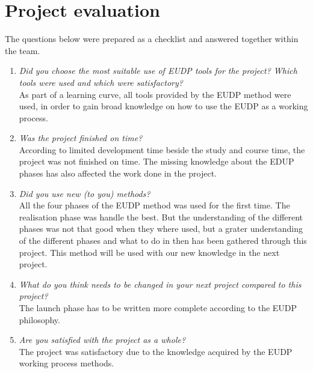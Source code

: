 \section{Project evaluation}
The questions below were prepared as a checklist and answered together within the team.
\begin{enumerate}
\item \textit{Did you choose the most suitable use of EUDP tools for the project? Which tools were used and which were satisfactory?}\\
		As part of a learning curve, all tools provided by the EUDP method were used, in order to gain broad knowledge on how to use the EUDP as a working process.
\item \textit{Was the project finished on time?}\\
		According to limited development time beside the study and course time, the project was not finished on time. The missing knowledge about the EDUP phases has also affected the work done in the project.
\item \textit{Did you use new (to you) methods?}\\
		All the four phases of the EUDP method was used for the first time. The realisation phase was handle the best. But the understanding of the different phases was not that good when they where used, but a grater understanding of the different phases and what to do in then has been gathered through this project. This method will be used with our new knowledge in the next project.
\item \textit{What do you think needs to be changed in your next project compared to this project?}\\
		The launch phase has to be written more complete according to the EUDP philosophy.
\item \textit{Are you satisfied with the project as a whole?} \\
		The project was satisfactory due to the knowledge acquired by the EUDP working process methods.
\end{enumerate}